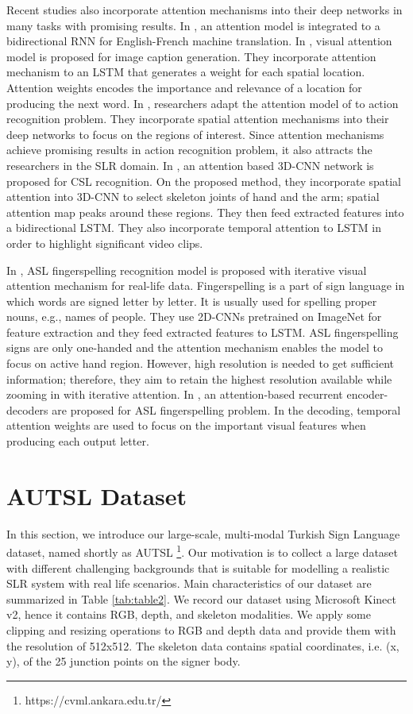 \documentclass[11pt, a4paper, singlecolumn]{article}
\begin{document}
Recent studies also incorporate attention mechanisms into their deep networks in many tasks with promising results. In \cite{bahdanau2014neural}, an attention model is integrated to a bidirectional RNN for English-French machine translation. In \cite{xu2015show}, visual attention model is proposed for image caption generation. They incorporate attention mechanism to an LSTM that generates a weight for each spatial location. Attention weights encodes the importance and relevance of a location for producing the next word. In \cite{sharma2015action}, researchers adapt the attention model of \cite{xu2015show} to action recognition problem. They incorporate spatial attention mechanisms into their deep networks to focus on the regions of interest. Since attention mechanisms achieve promising results in action recognition problem, it also attracts the researchers in the SLR domain. In \cite{li2020word}, an attention based 3D-CNN network is proposed for CSL recognition. On the proposed method, they incorporate spatial attention into 3D-CNN to select skeleton joints of hand and the arm; spatial attention map peaks around these regions. They then feed extracted features into a bidirectional LSTM. They also incorporate temporal attention to LSTM in order to highlight significant video clips. 

In \cite{shi2019fingerspelling}, ASL fingerspelling recognition model is proposed with iterative visual attention mechanism for real-life data. Fingerspelling is a part of sign language in which words are signed letter by letter. It is usually used for spelling proper nouns, e.g., names of people. They use 2D-CNNs pretrained on ImageNet for feature extraction and they feed extracted features to LSTM. ASL fingerspelling signs are only one-handed and the attention mechanism enables the model to focus on active hand region. However, high resolution is needed to get sufficient information; therefore, they aim to retain the highest resolution available while zooming in with iterative attention. In \cite{shi2018american}, an attention-based recurrent encoder-decoders are proposed for ASL fingerspelling problem. In the decoding, temporal attention weights are used to focus on the important visual features when producing each output letter. 

\section{AUTSL Dataset}
\label{sec:AUTSLDataset}

In this section, we introduce our large-scale, multi-modal Turkish Sign Language dataset, named shortly as AUTSL \footnote{{https://cvml.ankara.edu.tr/}}. Our motivation is to collect a large dataset with different challenging backgrounds that is suitable for modelling a realistic SLR system with real life scenarios. Main characteristics of our dataset are summarized in Table \ref{tab:table2}. We record our dataset using Microsoft Kinect v2, hence it contains RGB, depth, and skeleton modalities. We apply some clipping and resizing operations to RGB and depth data and provide them with the resolution of 512x512. The skeleton data contains spatial coordinates, i.e. (x, y), of the 25 junction points on the signer body.
\end{document}
